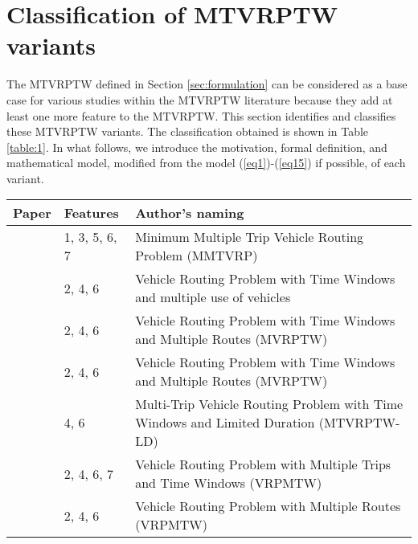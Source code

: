 
\section{Classification of MTVRPTW variants}
\label{sec:variants}

The MTVRPTW defined in Section \ref{sec:formulation} can be considered as a base case for various studies within the MTVRPTW literature because they add at least one more feature to the MTVRPTW.  This section identifies and classifies these MTVRPTW variants. The classification obtained is shown in Table \ref{table:1}.  In what follows, we introduce the motivation, formal definition, and mathematical model, modified from the model (\ref{eq1})-(\ref{eq15}) if possible, of each variant.

\begin{table}[]
\scriptsize
    \centering
    \begin{threeparttable}
    \begin{tabular}{@{}>{\raggedright}p{3cm}>{\raggedright}p{4cm}p{9cm}@{}}
    \toprule
         Paper  &   Features  &   Author's naming   \\
         \midrule
             \cite{battarra2009adaptive}
             & 1, 3, 5, 6, 7
             & Minimum Multiple Trip Vehicle Routing Problem (MMTVRP) \\
         \midrule
             \cite{azi2010exact}
             & 2, 4, 6
             & Vehicle Routing Problem with Time Windows and multiple use of vehicles \\
         \midrule
             \cite{macedo2011solving}
             & 2, 4, 6
             & Vehicle Routing Problem with Time Windows and Multiple Routes (MVRPTW) \\
         \midrule
             \cite{macedo2012generalized}
             & 2, 4, 6
             & Vehicle Routing Problem with Time Windows and Multiple Routes (MVRPTW) \\
         \midrule
             \cite{hernandez2014new}
             & 4, 6
             & Multi-Trip Vehicle Routing Problem with Time Windows and Limited Duration (MTVRPTW- LD) \\
         \midrule
             \cite{wang2014metaheuristic}
             & 2, 4, 6, 7
             & Vehicle Routing Problem with Multiple Trips and Time Windows (VRPMTW) \\
         \midrule
             \cite{azi2014adaptive}
             & 2, 4, 6
             & Vehicle Routing Problem with Multiple Routes (VRPMTW) \\

\end{tabular}
\end{threeparttable}
\end{table}
